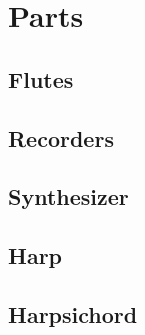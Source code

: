 \section{Parts}
\begin{center}
\fancyhf{} %
\renewcommand{\headrulewidth}{0pt} %
\rfoot{\thepage}
\pagestyle{plain}

\pagebreak

\subsection{Flutes}
\begin{center}
 
\end{center}

\pagebreak

\subsection{Recorders}
\begin{center}
 
\end{center}

\pagebreak

\subsection{Synthesizer}
\begin{center}
 
\end{center}

\pagebreak

\subsection{Harp}
\begin{center}
 
\pagebreak
\end{center}

\subsection{Harpsichord}
\pagebreak
\begin{center}
 
\end{center}


\end{center}



